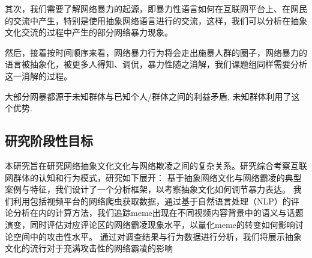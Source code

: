 \documentclass[12pt,a4paper]{ctexart}
\begin{document}
其次，我们需要了解网络暴力的起源，即暴力性语言如何在互联网平台上、在网民的交流中产生，特别是使用抽象网络语言进行的交流，这样，我们可以分析在抽象文化交流的过程中产生的部分网络暴力现象。

然后，接着按时间顺序来看，网络暴力行为将会走出施暴人群的圈子，网络暴力的语言被抽象化，被更多人得知、调侃，暴力性随之消解，我们课题组同样需要分析这一消解的过程。





大部分网暴都源于未知群体与已知个人/群体之间的利益矛盾, 未知群体利用了这个优势.


\subsection{研究阶段性目标}

本研究旨在研究网络抽象文化文化与网络欺凌之间的复杂关系。研究综合考察互联网群体的认知和行为模式，研究如下展开：
基于抽象网络文化与网络霸凌的典型案例与特征，我们设计了一个分析框架，以考察抽象文化如何调节暴力表达。
我们利用包括视频平台的网络爬虫获取数据，通过基于自然语言处理（NLP）的评论分析在内的计算方法，我们追踪meme出现在不同视频内容背景中的语义与话题演变，同时评估对应评论区的网络霸凌现象水平，以量化meme的转变如何影响讨论空间中的攻击性水平。
通过对调查结果与行为数据进行分析，我们将展示抽象文化的流行对于充满攻击性的网络霸凌的影响
\end{document}
